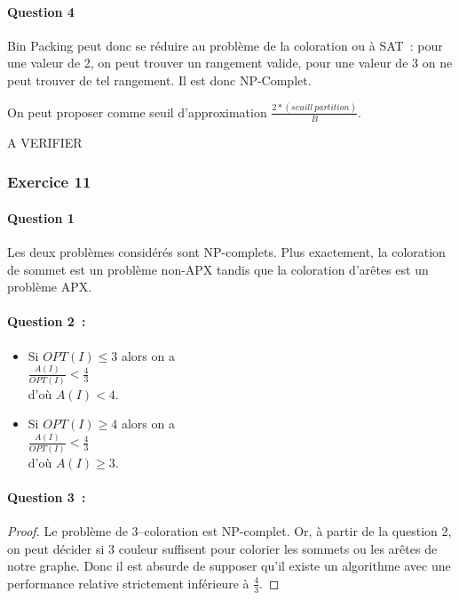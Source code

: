 \documentclass[a4paper, 12pt]{article}
\begin{document}
\paragraph{Question 4}

Bin Packing peut donc se réduire au problème de la coloration ou à
SAT~: pour une valeur de 2, on peut trouver un rangement valide, pour
une valeur de 3 on ne peut trouver de tel rangement. Il est donc
NP-Complet.

On peut proposer comme seuil d'approximation $\frac{2*(seuill~partition)}{B}$.


A VERIFIER

\subsubsection*{Exercice 11}

\paragraph{Question 1}

Les deux problèmes considérés sont NP-complets. Plus exactement, la
coloration de sommet est un problème non-APX tandis que la coloration
d'arêtes est un problème APX. 

\paragraph{Question 2~:}
\begin{itemize}
\item Si $OPT(I) \leq 3$ alors on a \\
$\frac{A(I)}{OPT(I)} < \frac{4}{3}$ \\
d'où $A(I) < 4$.
\item Si $OPT(I) \geq 4$ alors on a \\
$\frac{A(I)}{OPT(I)} < \frac{4}{3}$ \\
d'où $A(I) \geq 3$.
\end{itemize}

\paragraph{Question 3~:}

\begin{proof}
Le problème de 3--coloration est NP-complet. Or, à partir de la
question 2, on peut décider si 3 couleur suffisent pour colorier les
sommets ou les arêtes de notre graphe. Donc il est absurde de supposer
qu'il existe un algorithme avec une performance relative strictement
inférieure à $\frac{4}{3}$.
\end{proof}
\end{document}
